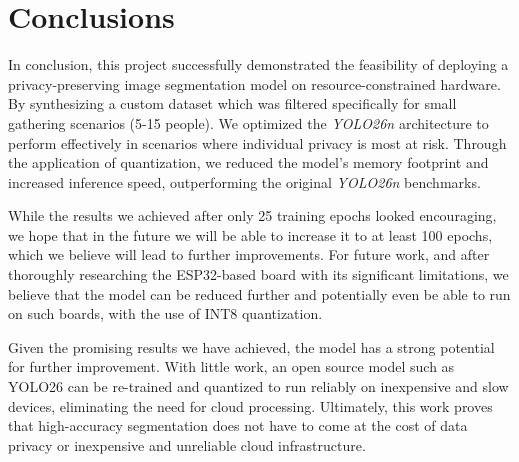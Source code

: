 \documentclass{proc}
\begin{document}
\section{Conclusions} %

In conclusion, this project successfully demonstrated the feasibility of deploying a privacy-preserving image segmentation model on resource-constrained hardware. By synthesizing a custom dataset which was filtered specifically for small gathering scenarios (5-15 people). We optimized the \textit{YOLO26n} architecture to perform effectively in scenarios where individual privacy is most at risk. Through the application of quantization, we reduced the model’s memory footprint and increased inference speed, outperforming the original \textit{YOLO26n} benchmarks. 

While the results we achieved after only 25 training epochs looked encouraging, we hope that in the future we will be able to increase it to at least 100 epochs, which we believe will lead to further improvements. For future work, and after thoroughly researching the ESP32-based board with its significant limitations, we believe that the model can be reduced further and potentially even be able to run on such boards, with the use of INT8 quantization.
 
Given the promising results we have achieved, the model has a strong potential for further improvement. With little work, an open source model such as YOLO26 can be re-trained and quantized to run reliably on inexpensive and slow devices, eliminating the need for cloud processing. Ultimately, this work proves that high-accuracy segmentation does not have to come at the cost of data privacy or inexpensive and unreliable cloud infrastructure.




\appendix

\end{document}
